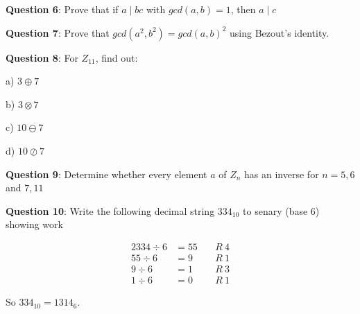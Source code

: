 \documentclass{article} %
\newcommand{\question}[2][]{\begin{flushleft}
        \textbf{Question #1}: #2

\end{flushleft}}
\begin{document}
    \question[6]{Prove that if $a \mid bc$ with $gcd(a, b) = 1$, then $a \mid c$}

    \question[7]{Prove that $gcd(a^2,b^2)=gcd(a,b)^2$ using Bezout's identity.}

    \question[8]{For $Z_{11}$, find out:}
    
    a) $3 \oplus 7$

    b) $3 \otimes 7$

    c) $10 \ominus 7$

    d) $10 \oslash 7$

    \question[9]{Determine whether every element $a$ of $Z_n$ has an inverse for $n = 5, 6$ and $ 7, 11$}

    \question[10]{Write the following decimal string $334_{10}$ to senary (base 6) showing work}
    \begin{alignat*}{2}
        334 \div 6 &= 55\ &&R\ 4\\
        55 \div 6 &= 9 &&R\ 1\\
        9 \div 6 &= 1 &&R\ 3\\
        1 \div 6 &= 0 &&R\ 1
    \end{alignat*}

    So $334_{10} = 1314_6$.
\end{document}
